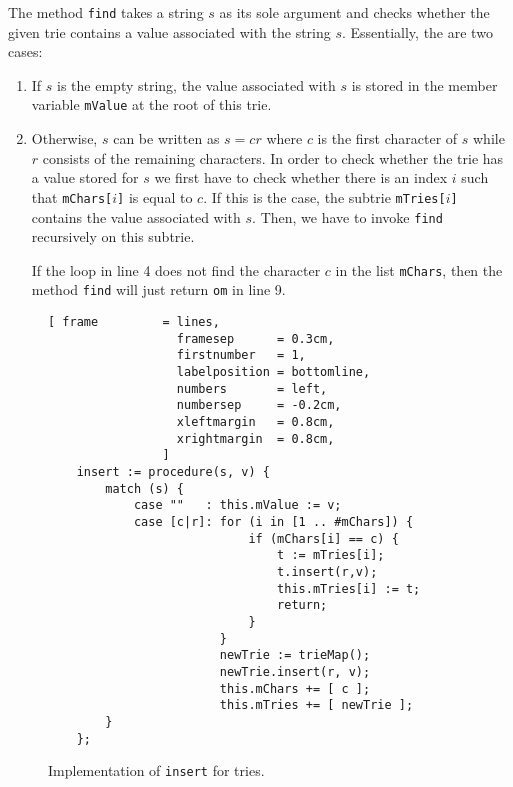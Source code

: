 The method \texttt{find} takes a string $s$ as its sole argument and checks whether the given trie
contains a value associated with the string $s$.  Essentially, the are two cases:
\begin{enumerate}
\item If $s$ is the empty string, the value associated with $s$ is stored in the member variable
      \texttt{mValue} at the root of this trie.
\item Otherwise, $s$ can be written as $s = cr$ where $c$ is the first character of $s$ while $r$
      consists of the remaining characters.  In order to check whether the trie has a value stored
      for $s$ we first have to check whether there is an index $i$ such that \texttt{mChars[$i$]} is
      equal to $c$.  If this is the case, the subtrie \texttt{mTries[$i$]} contains the value
      associated with $s$.  Then, we have to invoke \texttt{find} recursively on this subtrie.

      If the loop in line 4 does not find the character $c$ in the list \texttt{mChars}, then the method
      \texttt{find} will just return \texttt{om} in line 9.
\end{enumerate}


\begin{figure}[!ht]
\centering
\begin{Verbatim}[ frame         = lines, 
                  framesep      = 0.3cm, 
                  firstnumber   = 1,
                  labelposition = bottomline,
                  numbers       = left,
                  numbersep     = -0.2cm,
                  xleftmargin   = 0.8cm,
                  xrightmargin  = 0.8cm,
                ]
    insert := procedure(s, v) {
        match (s) {
            case ""   : this.mValue := v;
            case [c|r]: for (i in [1 .. #mChars]) {
                            if (mChars[i] == c) {
                                t := mTries[i];
                                t.insert(r,v);
                                this.mTries[i] := t;
                                return;
                            }
                        }
                        newTrie := trieMap();
                        newTrie.insert(r, v);
                        this.mChars += [ c ]; 
                        this.mTries += [ newTrie ];
        } 
    };
\end{Verbatim}
\vspace*{-0.3cm}
\caption{Implementation of \texttt{insert} for tries.}
\label{fig:trie.stlx-insert}
\end{figure}


